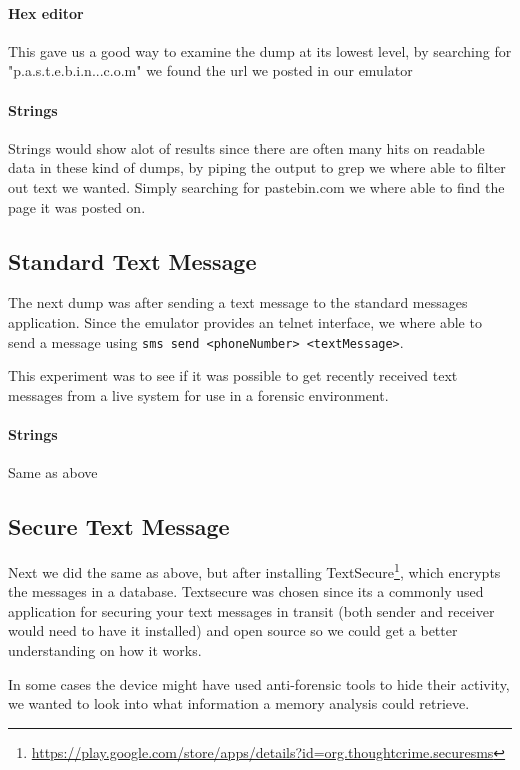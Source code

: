   \paragraph{Hex editor}
  This gave us a good way to examine the dump at its lowest level, by searching for 
  "p.a.s.t.e.b.i.n...c.o.m" we found the url we posted in our emulator

  \paragraph{Strings}
  Strings would show alot of results since there are often many hits on readable 
  data in these kind of dumps, by piping the output to grep we where able to 
  filter out text we wanted. Simply searching for pastebin.com we where able to 
  find the page it was posted on. 
  
  \subsection{Standard Text Message}
  The next dump was after sending a text message to the standard messages application. 
  Since the emulator provides an telnet interface, we where able to send a message 
  using \texttt{sms send <phoneNumber> <textMessage>}.
  
  This experiment was to see if it was possible to get recently received text 
  messages from a live system for use in a forensic environment.

  \paragraph{Strings}
  Same as above %
  \subsection{Secure Text Message}
  Next we did the same as above, but after installing 
  TextSecure\footnote{\url{https://play.google.com/store/apps/details?id=org.thoughtcrime.securesms}}, 
  which encrypts the messages in a database. Textsecure was chosen since its a commonly 
  used application for securing your text 
  messages in transit (both sender and receiver would need to have it installed) and open source 
  so we could get a better understanding 
  on how it works. 
  
  In some cases the device might have used anti-forensic tools to hide their 
  activity, we wanted to look into what information a memory analysis could 
  retrieve.
